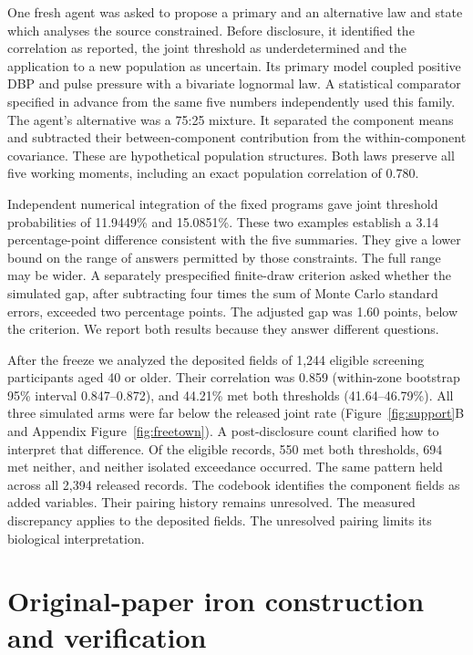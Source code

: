 One fresh agent was asked to propose a primary and an alternative law and state which analyses the source constrained. Before disclosure, it identified the correlation as reported, the joint threshold as underdetermined and the application to a new population as uncertain. Its primary model coupled positive DBP and pulse pressure with a bivariate lognormal law. A statistical comparator specified in advance from the same five numbers independently used this family. The agent's alternative was a 75:25 mixture. It separated the component means and subtracted their between-component contribution from the within-component covariance. These are hypothetical population structures. Both laws preserve all five working moments, including an exact population correlation of 0.780.

Independent numerical integration of the fixed programs gave joint threshold probabilities of 11.9449\% and 15.0851\%. These two examples establish a 3.14 percentage-point difference consistent with the five summaries. They give a lower bound on the range of answers permitted by those constraints. The full range may be wider. A separately prespecified finite-draw criterion asked whether the simulated gap, after subtracting four times the sum of Monte Carlo standard errors, exceeded two percentage points. The adjusted gap was 1.60 points, below the criterion. We report both results because they answer different questions.

After the freeze we analyzed the deposited fields of 1,244 eligible screening participants aged 40 or older. Their correlation was 0.859 (within-zone bootstrap 95\% interval 0.847--0.872), and 44.21\% met both thresholds (41.64--46.79\%). All three simulated arms were far below the released joint rate (Figure~\ref{fig:support}B and Appendix Figure~\ref{fig:freetown}). A post-disclosure count clarified how to interpret that difference. Of the eligible records, 550 met both thresholds, 694 met neither, and neither isolated exceedance occurred. The same pattern held across all 2,394 released records. The codebook identifies the component fields as added variables. Their pairing history remains unresolved. The measured discrepancy applies to the deposited fields. The unresolved pairing limits its biological interpretation.

\section{Original-paper iron construction and verification}
\label{app:ironpros}

